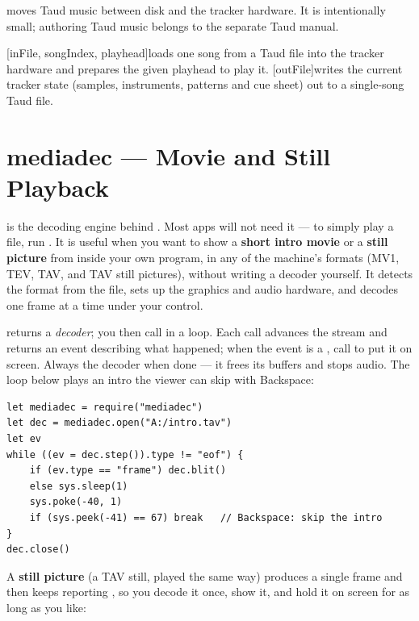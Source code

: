 moves Taud music between disk and the tracker hardware. It is intentionally small; authoring Taud music belongs to the separate Taud manual.

\begin{outline}
\1[inFile, songIndex, playhead]{loads one song from a Taud file into the tracker hardware and prepares the given playhead to play it.}
\1[outFile]{writes the current tracker state (samples, instruments, patterns and cue sheet) out to a single-song Taud file.}
\end{outline}

\section{mediadec --- Movie and Still Playback}

 is the decoding engine behind . Most apps will not need it --- to simply play a file, run . It is useful when you want to show a \textbf{short intro movie} or a \textbf{still picture} from inside your own program, in any of the machine's formats (MV1, TEV, TAV, and TAV still pictures), without writing a decoder yourself. It detects the format from the file, sets up the graphics and audio hardware, and decodes one frame at a time under your control.

 returns a \emph{decoder}; you then call  in a loop. Each call advances the stream and returns an event describing what happened; when the event is a , call  to put it on screen. Always  the decoder when done --- it frees its buffers and stops audio. The loop below plays an intro the viewer can skip with Backspace:

\begin{lstlisting}
let mediadec = require("mediadec")
let dec = mediadec.open("A:/intro.tav")
let ev
while ((ev = dec.step()).type != "eof") {
    if (ev.type == "frame") dec.blit()
    else sys.sleep(1)
    sys.poke(-40, 1)
    if (sys.peek(-41) == 67) break   // Backspace: skip the intro
}
dec.close()
\end{lstlisting}

A \textbf{still picture} (a TAV still, played the same way) produces a single frame and then keeps reporting , so you decode it once, show it, and hold it on screen for as long as you like:

